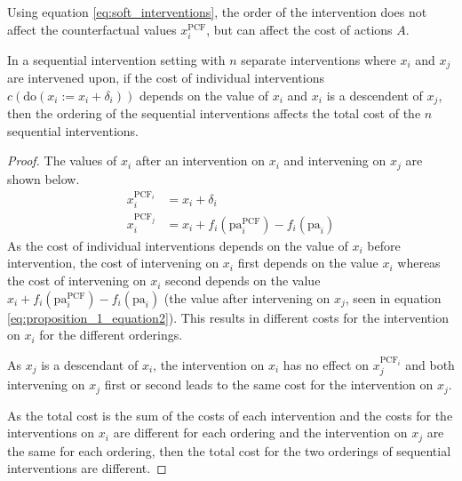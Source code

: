 Using equation \ref{eq:soft_interventions}, the order of the intervention does not affect the counterfactual values $x^{\text{PCF}}_i$, but can affect the cost of actions $A$.


\begin{proposition} \label{sequential_proposition}
	In a sequential intervention setting with $n$ separate interventions where $x_i$ and $x_j$ are intervened upon, if the cost of individual interventions $c(\text{do}(x_i:=x_i + \delta_i))$ depends on the value of $x_i$ and $x_i$ is a descendent of $x_j$, then the ordering of the sequential interventions affects the total cost of the $n$ sequential interventions.
\end{proposition}

\begin{proof}
	The values of $x_i$ after an intervention on $x_i$ and intervening on $x_j$ are shown below.
	\begin{align} \label{eq:proposition_1_equation}
		x^{\text{PCF}_i}_i & = x_i + \delta_i \\ \label{eq:proposition_1_equation2}
		x^{\text{PCF}_j}_i & = x_i + f_i(\text{pa}^{\text{PCF}}_i) - f_i(\text{pa}_i)
	\end{align}
	As the cost of individual interventions depends on the value of $x_i$ before intervention, the cost of intervening on $x_i$ first depends on the value $x_i$ whereas the cost of intervening on $x_i$ second depends on the value $x_i + f_i(\text{pa}^{\text{PCF}}_i) - f_i(\text{pa}_i)$ (the value after intervening on $x_j$, seen in equation \ref{eq:proposition_1_equation2}). This results in different costs for the intervention on $x_i$ for the different orderings.
	
	As $x_j$ is a descendant of $x_i$, the intervention on $x_i$ has no effect on $x^{\text{PCF}_i}_j$ and both intervening on $x_j$ first or second leads to the same cost for the intervention on $x_j$.
	
	As the total cost is the sum of the costs of each intervention and the costs for the interventions on $x_i$ are different for each ordering and the intervention on $x_j$ are the same for each ordering, then the total cost for the two orderings of sequential interventions are different. 
\end{proof}

